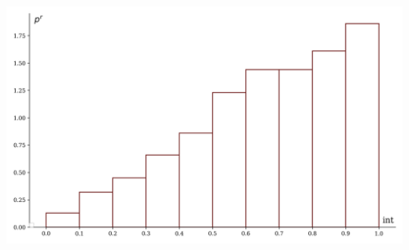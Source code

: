 \documentclass[a4paper, 14pt]{extarticle}
\begin{document}
\begin{minipage}[t]{0.25\textwidth}
  \includegraphics[width=\textwidth, height=\textheight, keepaspectratio]{sample4_hist}
\end{minipage}
\end{document}
